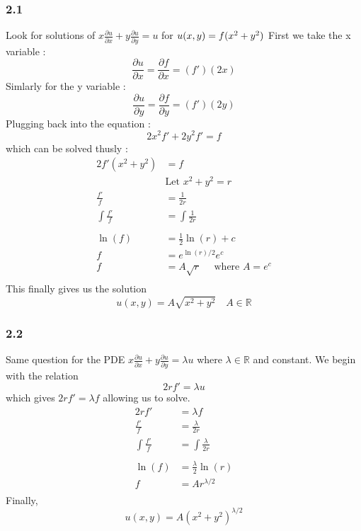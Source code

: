 \subsubsection{2.1}
Look for solutions of $ x \frac{ \partial u }{ \partial x  } + y \frac{ \partial u  }{
\partial y } = u $ for $ u(x,y) = f(x^2 + y^2) \\ $
First we take the x variable : 
\[
\frac{ \partial u  }{ \partial x } = \frac{ \partial f }{ \partial x } = \left( f'\right)
\left( 2x\right) 
\]
Simlarly for the y variable : 
\[
\frac{ \partial u  }{ \partial y } = \frac{ \partial f }{ \partial y  } = \left( f'
\right) \left( 2y\right) 
\]
Plugging back into the equation : 
\[
2x^2f' + 2y^2f' = f
\]
which can be solved thusly : 
\begin{align*}
    2f' \left( x^2 + y^2 \right) &= f \\
    &\text{Let } x^2 + y^2 = r  \\ 
    \frac{ f' }{ f } &= \frac{ 1 }{ 2 r } \\
    \int\limits_{ }^{ } \frac{ f'  }{ f }  &= \int\limits_{ }^{ } \frac{ 1 }{ 2r }  \\ 
    \ln \left( f\right) &= \frac{ 1 }{ 2 } \ln \left( r\right) + c \\
    f &= e^{\ln(r) / 2 } e^c \\ 
    f &= A\sqrt{r} \quad \text{ where } A = e^c\\ 
\end{align*}
This finally gives us the solution 
\[
    u(x,y) = A\sqrt{x^2 + y^2} \quad A \in \mathbb{R}
\]

\subsubsection{2.2}
Same question for the PDE $ x \frac{ \partial  u }{ \partial x } + y\frac{ \partial u }{
\partial y  }  = \lambda u $ where $ \lambda \in \mathbb{R}  $ and constant.
We begin with the relation 
\[
2rf' = \lambda u 
\]
which gives $ 2rf' = \lambda f $ allowing us to solve. 
\begin{align*}
    2rf'  &= \lambda f \\ 
    \frac{ f' }{ f }  &= \frac{ \lambda  }{ 2r }  \\ 
    \int\limits_{ }^{ } \frac{ f' }{ f } &= \int\limits_{ }^{ } \frac{ \lambda }{ 2r } \\
    \ln\left( f\right)  &= \frac{ \lambda }{ 2 } \ln\left( r\right)  \\ 
    f &= Ar^{ \lambda /  2  } \\ 
\end{align*}
Finally, 
\[
    u(x,y) = A\left( x^2 + y^2 \right) ^{\lambda / 2} 
\]

